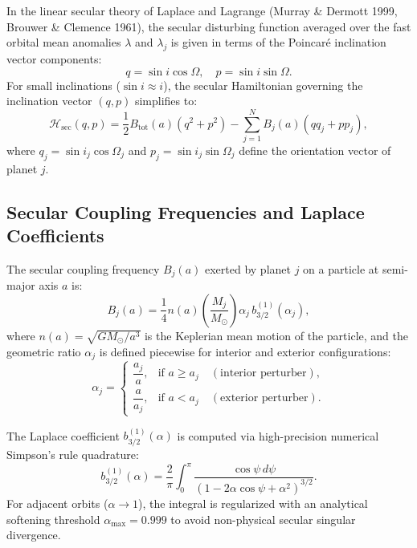 \documentclass[11pt,a4paper]{article}
\begin{document}
In the linear secular theory of Laplace and Lagrange (Murray \& Dermott 1999, Brouwer \& Clemence 1961), the secular disturbing function averaged over the fast orbital mean anomalies $\lambda$ and $\lambda_j$ is given in terms of the Poincaré inclination vector components:
\begin{equation}
q = \sin i \cos \Omega, \quad p = \sin i \sin \Omega.
\end{equation}
For small inclinations ($\sin i \approx i$), the secular Hamiltonian governing the inclination vector $(q, p)$ simplifies to:
\begin{equation}
\mathcal{H}_{\text{sec}}(q, p) = \frac{1}{2} B_{\text{tot}}(a) \left( q^2 + p^2 \right) - \sum_{j=1}^N B_j(a) \left( q q_j + p p_j \right),
\end{equation}
where $q_j = \sin i_j \cos \Omega_j$ and $p_j = \sin i_j \sin \Omega_j$ define the orientation vector of planet $j$.

\subsection{Secular Coupling Frequencies and Laplace Coefficients}
The secular coupling frequency $B_j(a)$ exerted by planet $j$ on a particle at semi-major axis $a$ is:
\begin{equation}
B_j(a) = \frac{1}{4} n(a) \left( \frac{M_j}{M_\odot} \right) \alpha_j \, b_{3/2}^{(1)}(\alpha_j),
\end{equation}
where $n(a) = \sqrt{G M_\odot / a^3}$ is the Keplerian mean motion of the particle, and the geometric ratio $\alpha_j$ is defined piecewise for interior and exterior configurations:
\begin{equation}
\alpha_j = 
\begin{cases}
\dfrac{a_j}{a}, & \text{if } a \ge a_j \quad (\text{interior perturber}), \\[1.5ex]
\dfrac{a}{a_j}, & \text{if } a < a_j \quad (\text{exterior perturber}).
\end{cases}
\end{equation}

The Laplace coefficient $b_{3/2}^{(1)}(\alpha)$ is computed via high-precision numerical Simpson's rule quadrature:
\begin{equation}
b_{3/2}^{(1)}(\alpha) = \frac{2}{\pi} \int_0^\pi \frac{\cos \psi \, d\psi}{\left( 1 - 2\alpha \cos \psi + \alpha^2 \right)^{3/2}}.
\end{equation}
For adjacent orbits ($\alpha \to 1$), the integral is regularized with an analytical softening threshold $\alpha_{\max} = 0.999$ to avoid non-physical secular singular divergence.
\end{document}

